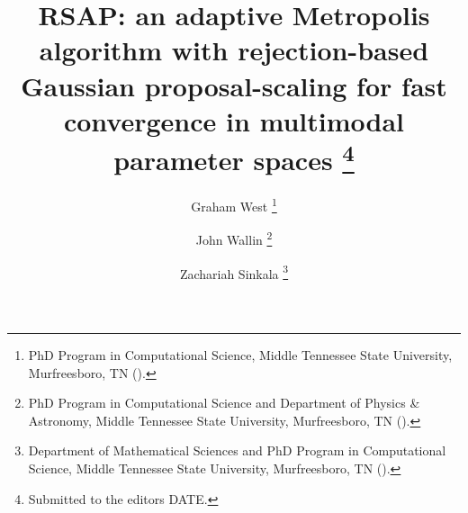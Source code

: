 

\usepackage[utf8]{inputenc}
\usepackage[english]{babel}
\usepackage{lipsum}
\usepackage{amsfonts}
\usepackage{graphicx}
\usepackage{epstopdf}
\usepackage{algorithmic}
\usepackage{textpos}
\usepackage{verbatim}
\usepackage{textcomp}
\usepackage{varwidth}


\newenvironment{tight_enum}{
\begin{enumerate}[label=\alph*.]
\setlength{\itemsep}{0pt}
\setlength{\parskip}{0pt}
}{\end{enumerate}}

\ifpdf
\else
\fi

\usepackage{enumitem}

\newcommand{\creflastconjunction}{, and~}



\title{RSAP: an adaptive Metropolis algorithm with rejection-based Gaussian proposal-scaling for fast convergence in multimodal parameter spaces \thanks{Submitted to the editors DATE.
}}

\author{Graham West \thanks{PhD Program in Computational Science, Middle Tennessee State University, Murfreesboro, TN 
  ().}
\and John Wallin \thanks{PhD Program in Computational Science and Department of Physics \& Astronomy, Middle Tennessee State University, Murfreesboro, TN ().}
\and Zachariah Sinkala \thanks{Department of Mathematical Sciences and PhD Program in Computational Science, Middle Tennessee State University, Murfreesboro, TN ().}
}

\usepackage{amsopn}
\DeclareMathOperator{\diag}{diag}


